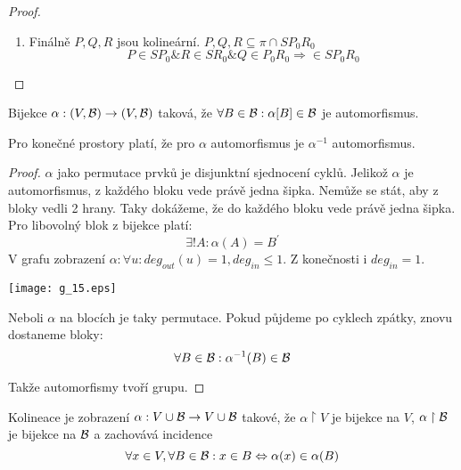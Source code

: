 \begin{proof}
\begin{enumerate}
\begin{enumerate}
			\item Finálně $P, Q, R$ jsou kolineární.
			$P, Q, R \subseteq \pi \cap SP_0R_0$
			\[ P \in SP_0 \& R \in SR_0 \& Q \in P_0R_0 \Rightarrow \in SP_0R_0 \]
			\end{enumerate}
	\end{enumerate}
\end{proof}

\begin{definition}[Automorfismus]
    Bijekce $\alpha: (V,\operatorname{\mathcal{B}})\rightarrow (V,\operatorname{\mathcal{B}})$ taková, že $\forall B\in \operatorname{\mathcal{B}}: \alpha[B]\in\operatorname{\mathcal{B}}$ je automorfismus.
\end{definition}

\begin{note}
    Pro konečné prostory platí, že pro $\alpha$ automorfismus je $\alpha^{-1}$ automorfismus.
\end{note}
\begin{proof}
	$\alpha$ jako permutace prvků je disjunktní sjednocení cyklů.
	Jelikož $\alpha$ je automorfismus, z každého bloku vede právě jedna šipka.
	Nemůže se stát, aby z bloky vedli 2 hrany.
	Taky dokážeme, že do každého bloku vede právě jedna šipka.
	Pro libovolný blok z bijekce platí:
	\[ \exists! A: \alpha(A) = B^{\prime} \]
	V grafu zobrazení $\alpha: \forall u: deg_{out}(u) = 1, deg_{in} \leq 1$.
	Z konečnosti i $deg_{in} = 1$.

    	\texttt{[image: g\_15.eps]}

	Neboli $\alpha$ na blocích je taky permutace.
	Pokud půjdeme po cyklech zpátky, znovu dostaneme bloky:
	\[ \forall B \in \operatorname{\mathcal{B}}: \alpha^{-1}(B) \in \operatorname{\mathcal{B}} \]

	Takže automorfismy tvoří grupu.
\end{proof}

\begin{definition}[Kolineace]
    Kolineace je zobrazení $\alpha: V \cup \operatorname{\mathcal{B}} \rightarrow V \cup \operatorname{\mathcal{B}}$ takové, že $\alpha\upharpoonright V$ je bijekce na $V$, $\alpha\upharpoonright \operatorname{\mathcal{B}}$ je bijekce na $\operatorname{\mathcal{B}}$ a zachovává incidence
    \[ \forall x \in V, \forall B \in \operatorname{\mathcal{B}}: x \in B \Leftrightarrow \alpha(x) \in \alpha(B) \]
\end{definition}

